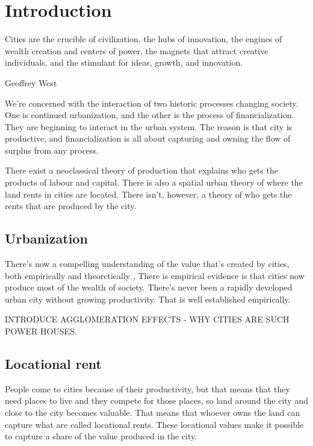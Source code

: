 \chapter{Introduction} \label{chapter-introduction}
\epigraph{Cities are the crucible of civilization, the hubs of innovation, the engines of wealth creation and centers of power, the magnets that attract creative individuals, and the stimulant for ideas, growth, and innovation.}{Geoffrey West \cite{westScaleUniversalLaws2017}}

We're concerned with the interaction of two historic processes changing society. One is continued urbanization, and the other is the process of financialization. 
They are beginning to interact in the urban system. 
The reason is that city is productive, and financialization is all about capturing and owning the flow of surplus from any process. 


There exist a neoclassical theory of production that explains who gets the products of labour and capital. There is also a spatial urban theory of where the land rents in cities are located. There isn't, however, a theory of who gets the rents that are produced by the city.

\section{Urbanization}
There's now a compelling understanding of the value that's created by cities, both empirically and theoretically \cite{jacobsEconomyCities1969, spenceUrbanizationGrowth2009, bettencourtIntroductionUrbanScience2021}, 
There is empirical evidence is that cities now produce most of the wealth of society. There's never been a rapidly developed urban city without growing productivity. That is well established empirically. 

INTRODUCE AGGLOMERATION EFFECTS - %
WHY CITIES ARE SUCH POWER HOUSES.


\section{Locational rent}
People come to cities because of their productivity, but that means that they need places to live and they compete for those places, so land around the city and close to the city becomes valuable. That means that whoever owns the land can capture what are called \glspl{locational rent}.  These locational values make it possible to capture a share of the value produced in the city.

